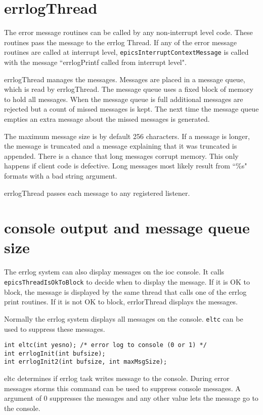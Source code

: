 \section{errlogThread}

The error message routines can be called by any non-interrupt level code. These routines pass the message to the errlog 
Thread. If any of the error message routines are called at interrupt level,  \verb|epicsInterruptContextMessage| is 
called with the message ``errlogPrintf called from interrupt level".

errlogThread manages the messages. Messages are placed in a message queue, which is read by errlogThread. The 
message queue uses a fixed block of memory to hold all messages. When the message queue is full additional messages 
are rejected but a count of missed messages is kept. The next time the message queue empties an extra message about the 
missed messages is generated.

The maximum message size is by default 256  characters. If a message is longer, the message is truncated and a message 
explaining that it was truncated is appended. There is a chance that long messages corrupt memory. This  only happens if 
client code is defective. Long messages most likely result from ``\%s" formats with a bad string argument.

errlogThread passes each message to any registered listener.

\section{console output and message queue size}

The errlog system can also display messages on the ioc console. It calls \verb|epicsThreadIsOkToBlock| to decide when 
to display the message. If it is OK to block, the message is displayed by the same thread that calls one of the errlog print 
routines. If it is not OK to block, errlorThread displays the messages.

Normally the errlog system displays all messages on the console. \verb|eltc| can be used to suppress these messages.

\begin{verbatim}int eltc(int yesno); /* error log to console (0 or 1) */
int errlogInit(int bufsize);
int errlogInit2(int bufsize, int maxMsgSize);
\end{verbatim}
eltc determines if errlog task writes message to the console. During error messages storms  this  command can be used to 
suppress console messages. A argument of 0 suppresses the messages and any other value lets the message go to the 
console. 

